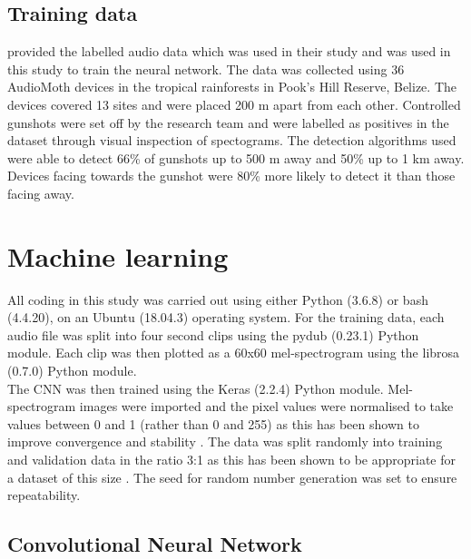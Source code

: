 \subsection{Training data}

\cite{Hill2018} provided the labelled audio data which was used in their study and was used in this study to train the neural network. The data was collected using 36 AudioMoth devices in the tropical rainforests in Pook's Hill Reserve, Belize. The devices covered 13 sites and were placed 200 m apart from each other. Controlled gunshots were set off by the research team and were labelled as positives in the dataset through visual inspection of spectograms. The detection algorithms used were able to detect 66\% of gunshots up to 500 m away and 50\% up to 1 km away. Devices facing towards the gunshot were 80\% more likely to detect it than those facing away.



\section{Machine learning}

All coding in this study was carried out using either Python (3.6.8) or bash (4.4.20), on an Ubuntu (18.04.3) operating system. For the training data, each audio file was split into four second clips using the pydub (0.23.1) Python module. Each clip was then plotted as a 60x60 mel-spectrogram using the librosa (0.7.0) Python module.\\

\noindent The CNN was then trained using the Keras (2.2.4) Python module. Mel-spectrogram images were imported and the pixel values were normalised to take values between 0 and 1 (rather than 0 and 255) as this has been shown to improve convergence and stability \citep{Liao2016}. The data was split randomly into training and validation data in the ratio 3:1 as this has been shown to be appropriate for a dataset of this size \citep{Guyon1997}. The seed for random number generation was set to ensure repeatability.

\subsection{Convolutional Neural Network}

